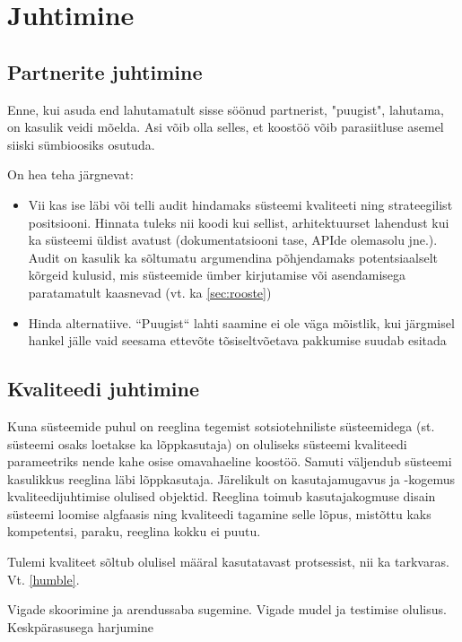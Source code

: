 \chapter{Juhtimine}
\section{Partnerite juhtimine}
Enne, kui asuda end lahutamatult sisse söönud partnerist, "puugist", lahutama, on kasulik veidi mõelda. Asi võib olla selles, et koostöö võib parasiitluse asemel siiski sümbioosiks osutuda. 

On hea teha järgnevat:
\begin{itemize}
	\item Vii kas ise läbi või telli audit hindamaks süsteemi kvaliteeti ning strateegilist positsiooni. Hinnata tuleks nii koodi kui sellist, arhitektuurset lahendust kui ka süsteemi üldist avatust (dokumentatsiooni tase, APIde olemasolu jne.). Audit on kasulik ka sõltumatu argumendina põhjendamaks potentsiaalselt kõrgeid kulusid, mis süsteemide ümber kirjutamise või asendamisega paratamatult kaasnevad (vt. ka \ref{sec:rooste})
	\item Hinda alternatiive. ``Puugist`` lahti saamine ei ole väga mõistlik, kui järgmisel hankel jälle vaid seesama ettevõte tõsiseltvõetava pakkumise suudab esitada  
\end{itemize}

\section{Kvaliteedi juhtimine}
Kuna süsteemide puhul on reeglina tegemist sotsiotehniliste süsteemidega (st. süsteemi osaks loetakse ka lõppkasutaja) on oluliseks süsteemi kvaliteedi parameetriks nende kahe osise omavahaeline koostöö. Samuti väljendub süsteemi kasulikkus reeglina läbi lõppkasutaja. Järelikult on kasutajamugavus ja -kogemus kvaliteedijuhtimise olulised objektid. Reeglina toimub kasutajakogmuse disain süsteemi loomise algfaasis ning kvaliteedi tagamine selle lõpus, mistõttu kaks kompetentsi, paraku, reeglina kokku ei puutu.  

Tulemi kvaliteet sõltub olulisel määral kasutatavast protsessist, nii ka tarkvaras. Vt. \ref{humble}.

\TODO Vigade skoorimine ja arendussaba sugemine. Vigade mudel ja testimise olulisus. Keskpärasusega harjumine


